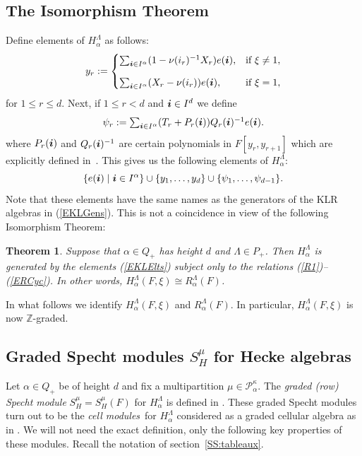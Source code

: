 \documentclass[twoside,11pt,reqno]{amsart}
\numberwithin{equation}{section}
\newtheorem{Theorem}[equation]{Theorem}
\theoremstyle{definition}  %
\def\bi{\text{\boldmath$i$}}
\newcommand{\Z}{\mathbb{Z}}
\newcommand{\0}{{\bar 0}}
\newcommand{\1}{{\bar 1}}
\newcommand{\La}{\Lambda}
\newcommand{\al}{\alpha}
\newcommand\Par[1][]{{\mathscr P}^{\kappa#1}}
\begin{document}
\subsection{The Isomorphism Theorem}
Define elements of $H^\La_\al$ as follows: 
\begin{equation}\label{QEPolKL}
  y_r:=\begin{cases}
\sum_{\bi\in I^\al}(1-\nu(i_r)^{-1} X_r)e(\bi),&\text{if $\xi \neq 1$},\\[3mm]
\sum_{\bi\in I^\al}(X_r-\nu(i_r)) e(\bi),&\text{if $\xi=1$},
\end{cases}
\end{equation}
for $1\leq r\leq d$.
Next, if $1\le r<d$ and $\bi\in I^d$ we define
\begin{equation}\label{QQCoxKL}
\psi_r:=
\textstyle \sum_{\bi\in I^\al}(T_r+P_r(\bi))Q_r(\bi)^{-1}e(\bi). %
\end{equation}
where $P_r(\bi)$ and $Q_r(\bi)^{-1}$ are certain polynomials in $F[y_r,y_{r+1}]$ which are explicitly defined
in~\cite{BK}. This gives us the following elements of $H_\al^\La$:
\begin{equation}\label{EKLElts}
\{e(\bi)\mid \bi\in I^\al\}\cup\{y_1,\dots,y_d\}\cup\{\psi_1,\dots,\psi_{d-1}\}.
\end{equation}
Note that these elements have the same names as the generators of the KLR algebras in (\ref{EKLGens}). This is not a coincidence in view of the following Isomorphism Theorem:

\begin{Theorem} \label{TBK} {\rm \cite[Theorem 1.1]{BK}} %
Suppose that $\al\in Q_+$ has height $d$ and $\La\in P_+$. Then $H_\al^\La$ is generated by the elements (\ref{EKLElts}) subject only to the relations (\ref{R1})--(\ref{ERCyc}). In other words, $H_\al^\La(F,\xi)\cong R_\al^\La(F)$. 
\end{Theorem}

In what follows we identify $H_\al^\La(F,\xi)$ and $R_\al^\La(F)$. In particular, $H_\al^\La(F,\xi)$ is now $\Z$-graded. 



\subsection{\boldmath Graded Specht modules $S^\mu_H$ for Hecke algebras}\label{SSHSpecht}
Let $\al\in Q_+$ be of height $d$ and fix a multipartition $\mu\in\Par_\al$. The {\em graded (row) Specht module} $S^\mu_H=S^\mu_H(F)$ for $H_\al^\La$ is defined in \cite{BKW}. These graded Specht modules turn out to be the {\em cell modules}\, for $H_\al^\La$ considered as a graded cellular algebra as in \cite{HM}. We will not need the exact definition, only the following key properties of these modules.  Recall the notation of section~\ref{SS:tableaux}. 
\end{document}
